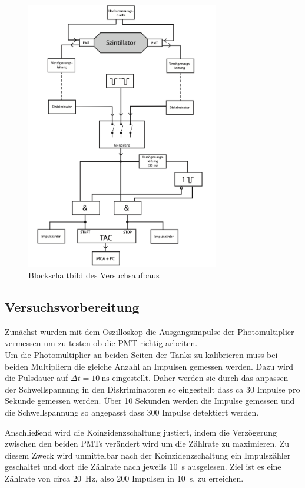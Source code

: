 \begin{figure}[H]
    \centering
    \includegraphics[width = 0.75\textwidth]{./bilder/Schaltbild.png}
    \caption{Blockschaltbild des Versuchsaufbaus \cite{anleitung}}
    \label{fig:schaltbild}
\end{figure}
\subsection{Versuchsvorbereitung}
Zunächst wurden mit dem Oszilloskop die Ausgangsimpulse der Photomultiplier vermessen um zu testen ob die PMT richtig arbeiten.\\
Um die Photomultiplier an beiden Seiten der Tanks zu kalibrieren muss bei beiden Multipliern die gleiche Anzahl an Impulsen gemessen werden.
Dazu wird die Pulsdauer auf $\Delta t = \SI{10}{\nano\second}$  eingestellt.
Daher werden sie durch das anpassen der Schwellspannung in den Diskriminatoren so eingestellt dass ca 30 Impulse pro Sekunde gemessen werden.
Über 10 Sekunden werden die Impulse gemessen und die Schwellspannung so angepasst dass 300 Impulse detektiert werden.

Anschließend wird die Koinzidenzschaltung justiert, indem die Verzögerung zwischen den beiden PMTs verändert wird um die Zählrate zu maximieren.
Zu diesem Zweck wird unmittelbar nach der Koinzidenzschaltung ein Impulszähler geschaltet und dort die Zählrate nach jeweils \SI{10}{\second} ausgelesen.
Ziel ist es eine Zählrate von circa \SI{20}{\hertz}, also \num{200} Impulsen in \SI{10}{\second}, zu erreichen.

